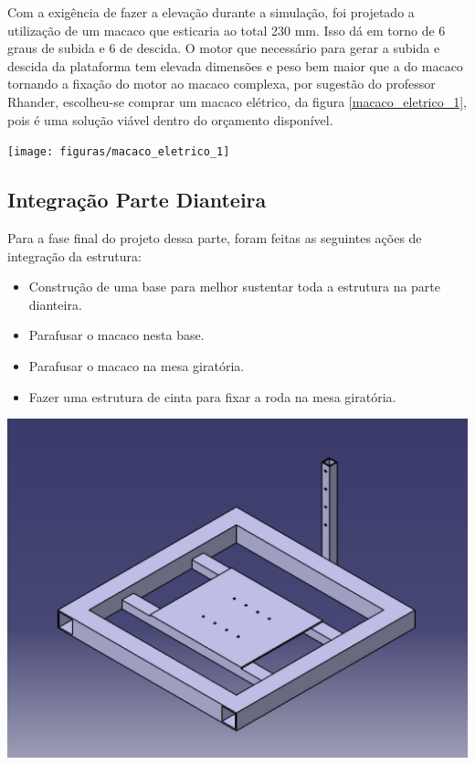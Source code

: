   Com a exigência de fazer a elevação durante a simulação, foi projetado a utilização de um macaco que esticaria ao total 230 mm. Isso dá em torno de 6 graus de subida e 6 de descida. O motor que necessário para gerar a subida e descida da plataforma  tem elevada dimensões e peso bem maior que a do macaco tornando a fixação do motor ao macaco complexa, por sugestão do professor Rhander, escolheu-se comprar um macaco elétrico, da figura \ref{macaco_eletrico_1}, pois é uma solução viável dentro do orçamento disponível.

    \begin{center}
    	\texttt{[image: figuras/macaco\_eletrico\_1]}
        \label{macaco_eletrico_1}
    \end{center}

\subsection{Integração Parte Dianteira}
  Para a fase final do projeto dessa parte, foram feitas as seguintes ações de integração da estrutura:
  \begin{itemize}
        \item Construção de uma base para melhor sustentar toda a estrutura na parte dianteira.
        \item Parafusar o macaco nesta base.
        \item Parafusar o macaco na mesa giratória.
        \item Fazer uma estrutura de cinta para fixar a roda na mesa giratória.
    \end{itemize}

    \begin{center}
    	\includegraphics[scale=0.5]{figuras/Base_dianteira}
        \label{base.dianteira}
    \end{center}


